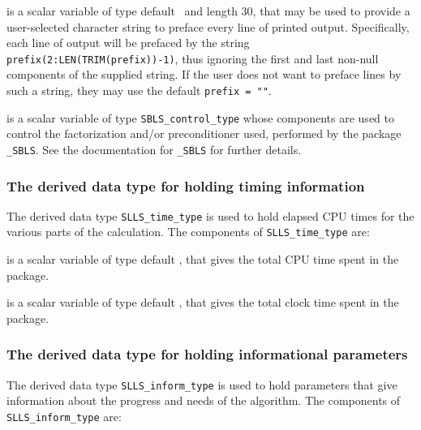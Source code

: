 \documentclass{galahad}
\newcommand{\packagename}{SLLS}
\begin{document}
\begin{description}
 is a scalar variable of type default \character\
and length 30, that may be used to provide a user-selected
character string to preface every line of printed output.
Specifically, each line of output will be prefaced by the string
{\tt prefix(2:LEN(TRIM(prefix))-1)},
thus ignoring the first and last non-null components of the
supplied string. If the user does not want to preface lines by such
a string, they may use the default {\tt prefix = ""}.

 is a scalar variable of type
{\tt SBLS\_control\_type} %
whose components are used to control the factorization and/or
preconditioner used,
performed by the package
{\tt \libraryname\_SBLS}.
See the documentation for {\tt \libraryname\_SBLS} for further details.

\end{description}


\subsubsection{The derived data type for holding timing
 information}\label{typetime}
The derived data type
{\tt \packagename\_time\_type}
is used to hold elapsed CPU times for the various parts of the calculation.
The components of
{\tt \packagename\_time\_type}
are:
\begin{description}
 is a scalar variable of type default \real, that gives
 the total CPU time spent in the package.

 is a scalar variable of type default \real, that gives
 the total clock time spent in the package.

\end{description}


\subsubsection{The derived data type for holding informational
 parameters}\label{typeinform}
The derived data type
{\tt \packagename\_inform\_type}
is used to hold parameters that give information about the progress and needs
of the algorithm. The components of
{\tt \packagename\_inform\_type}
are:
\end{document}
